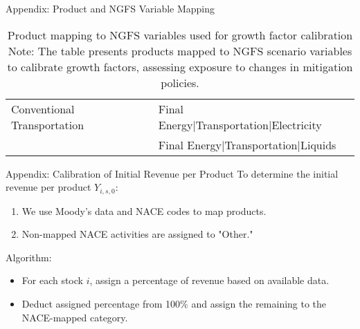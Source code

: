 \documentclass{beamer}
\begin{document}
\begin{frame}{Appendix: Product and NGFS Variable Mapping}
\begin{table}
{\begin{tabular}{|l|l|}
        Conventional Transportation & Final Energy|Transportation|Electricity \\
                                    & Final Energy|Transportation|Liquids     \\
        \hline
      \end{tabular}}
    \caption{Product mapping to NGFS variables used for growth factor calibration \\ \scriptsize Note: The table presents products mapped to NGFS scenario variables to calibrate growth factors, assessing exposure to changes in mitigation policies.}
  \end{table}
\end{frame}

\begin{frame}{Appendix: Calibration of Initial Revenue per Product}
  To determine the initial revenue per product $ Y_{i,s,0} $:
  \begin{enumerate}
    \item We use Moody’s data and NACE codes to map products.
    \item Non-mapped NACE activities are assigned to "Other."
  \end{enumerate}
  Algorithm:
  \begin{itemize}
    \item For each stock $ i $, assign a percentage of revenue based on available data.
    \item Deduct assigned percentage from 100\% and assign the remaining to the NACE-mapped category.
  \end{itemize}
\end{frame}
\end{document}
